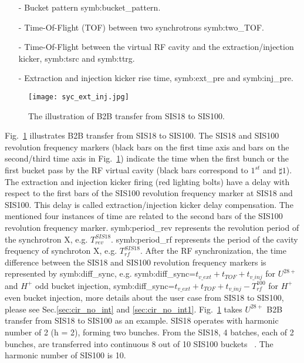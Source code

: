 \begin{itemize}
\item[-] Bucket pattern \gls{symb:bucket_pattern}.
\item[-] Time-Of-Flight (\gls{TOF}) between two synchrotrons \gls{symb:two_TOF}. 
\item[-] Time-Of-Flight between the virtual RF cavity and the extraction/injection kicker, \gls{symb:tsrc} and \gls{symb:ttrg}. 
\item[-] Extraction and injection kicker rise time, \gls{symb:ext_pre} and \gls{symb:inj_pre}.
\end{itemize}
\begin{figure}[H]
   \centering   
   \texttt{[image: syc\_ext\_inj.jpg]}
   \caption{The illustration of B2B transfer from SIS18 to SIS100.}
   \label{ext_inj_kicker}
\end{figure}
Fig.~\ref{ext_inj_kicker} illustrates B2B transfer from SIS18 to SIS100. The SIS18 and SIS100 revolution frequency markers (black bars on the first time axis and bars on the second/third time axis in Fig.~\ref{ext_inj_kicker}) indicate the time when the first bunch or the first bucket pass by the RF virtual cavity (black bars correspond to $1^{st}$ and $\sharp1$). The extraction and injection kicker firing (red lighting bolts) have a delay with respect to the first bars of the SIS100 revolution frequency marker at SIS18 and SIS100. This delay is called extraction/injection kicker delay compensation. The mentioned four instances of time are related to the second bars of the SIS100 revolution frequency marker. \gls{symb:period_rev} represents the revolution period of the synchrotron X, e.g. $T_{rev}^{SIS18}$. \gls{symb:period_rf} represents the period of the cavity frequency of synchroton X, e.g. $T_{rf}^{SIS18}$. After the RF synchronization, the time difference between the SIS18 and SIS100 revolution frequency markers is represented by \gls{symb:diff_sync}, e.g. \gls{symb:diff_sync}=$t_{v\_ext}+t_{TOF}+t_{v\_inj}$ for $U^{28+}$ and $H^{+}$ odd bucket injection,  \gls{symb:diff_sync}=$t_{v\_ext}+t_{TOF}+t_{v\_inj}- T_{rf}^{100}$ for $H^{+}$ even bucket injection, more details about the user case from SIS18 to SIS100, please see Sec.\ref{sec:cir_no_int} and \ref{sec:cir_no_int1}. Fig.~\ref{ext_inj_kicker} takes $U^{28+}$ B2B transfer from SIS18 to SIS100 as an example. SIS18 operates with harmonic number of 2 (h = 2), forming two bunches. From the SIS18, 4 batches, each of 2 bunches, are transferred into continuous 8 out of 10 SIS100 buckets ~\cite{liebermann_fair_2013, liebermann_sis100_2013}. The harmonic number of SIS100 is 10. 

